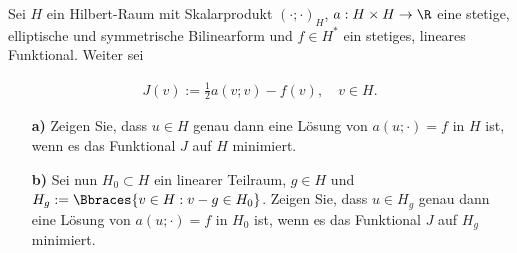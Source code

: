 
\begin{exercise}

Sei $H$ ein Hilbert-Raum mit Skalarprodukt $(\cdot;\cdot)_H$, $a : H \times H \rightarrow \R$
eine stetige, elliptische und symmetrische Bilinearform und $f \in H^*$ ein stetiges,
lineares Funktional. Weiter sei

\begin{align}
  J(v) := \frac{1}{2} a(v;v) - f(v), \quad v \in H.
\end{align}

\begin{itemize}
  \item[\textbf{a)}]
    Zeigen Sie, dass $u \in H$ genau dann eine Lösung von $a(u;\cdot) = f$ in $H$ ist,
    wenn es das Funktional $J$ auf $H$ minimiert.
  \item[\textbf{b)}]
    Sei nun $H_0 \subset H$ ein linearer Teilraum, $g \in H$ und
    $H_g := \Bbraces{v \in H: v - g \in H_0}$. Zeigen Sie, dass $u \in H_g$ genau
    dann eine Lösung von $a(u; \cdot) = f$ in $H_0$ ist, wenn es das Funktional $J$
    auf $H_g$ minimiert.
\end{itemize}
\end{exercise}


